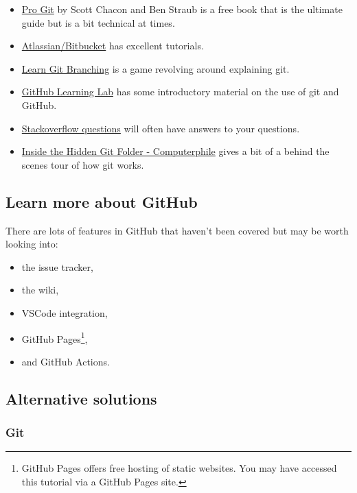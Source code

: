 \documentclass[11pt,onecolumn]{scrartcl}
\begin{document}
\begin{itemize}
\item \href{https://git-scm.com/book/en/v2}{Pro Git} by Scott Chacon and Ben Straub is a free book that is the ultimate
guide but is a bit technical at times.
\item \href{https://www.atlassian.com/git/tutorials}{Atlassian/Bitbucket} has excellent tutorials.
\item \href{https://learngitbranching.js.org/}{Learn Git Branching} is a game revolving around explaining git.
\item \href{https://lab.github.com/}{GitHub Learning Lab} has some introductory material on the use of git and
GitHub.
\item \href{https://stackoverflow.com/questions/tagged/git}{Stackoverflow questions} will often have answers to your questions.
\item \href{https://youtu.be/bSA91XTzeuA}{Inside the Hidden Git Folder - Computerphile} gives a bit of a behind the
scenes tour of how git works.
\end{itemize}

\subsection{Learn more about GitHub}
\label{sec:org8b5272a}

There are lots of features in GitHub that haven't been covered but may be worth
looking into:

\begin{itemize}
\item the issue tracker,
\item the wiki,
\item VSCode integration,
\item GitHub Pages\footnote{GitHub Pages offers free hosting of static websites. You may have accessed this tutorial via a GitHub Pages site.},
\item and GitHub Actions.
\end{itemize}

\subsection{Alternative solutions}
\label{sec:orgcca088f}

\subsubsection*{Git}
\label{sec:org6d5e477}
\end{document}

